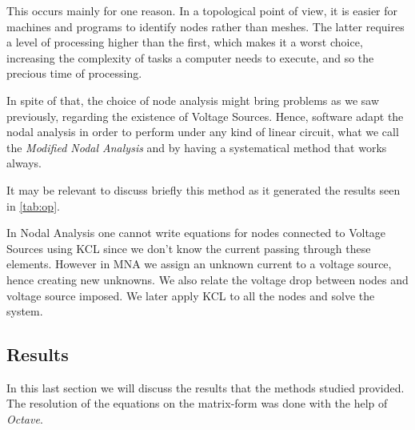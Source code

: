 This occurs mainly for one reason. In a topological point of view, it is easier for machines and programs to identify nodes rather than meshes. The latter requires a level of processing higher than the first, which makes it a worst choice, increasing the complexity of tasks a computer needs to execute, and so the precious time of processing.

In spite of that, the choice of node analysis might bring problems as we saw previously, regarding the existence of Voltage Sources. Hence, software adapt the nodal analysis in order to perform under any kind of linear circuit, what we call the \textit{Modified Nodal Analysis} and by having a systematical method that works always.
 
It may be relevant to discuss briefly this method as it generated the results seen in \ref{tab:op}. \par
In Nodal Analysis one cannot write equations for nodes connected to Voltage Sources using KCL since we don't know the current passing through these elements. 
However in MNA we assign an unknown current to a voltage source, hence creating new unknowns. We also relate the voltage drop between nodes and voltage source imposed.  We later apply KCL to all the nodes and solve the system.


\pagebreak
\subsection{Results}
\label{subsec:results}

In this last section we will discuss the results that the methods studied provided. The resolution of the equations on the matrix-form was done with the help of \textit{Octave}. 


